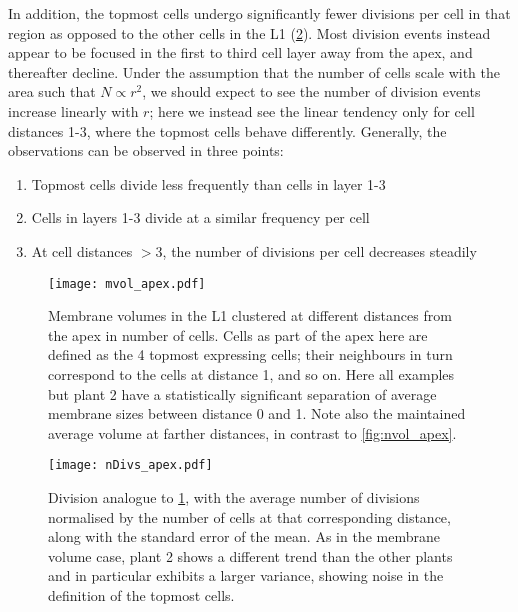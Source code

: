  In addition, the topmost cells undergo significantly fewer divisions per cell in
 that region as opposed to the other cells in the L1 (\cref{fig:nDivs_apex}).
 Most division events instead appear to be focused in the first to third cell
 layer away from the apex, and thereafter decline. Under the assumption that the
 number of cells scale with the area such that $N \propto r^2$, we should expect
 to see the number of division events increase linearly with $r$; here we
 instead see the linear tendency only for cell distances 1-3, where the topmost cells
 behave differently. Generally, the observations can be observed in three
 points:
 \begin{enumerate}
   \item Topmost cells divide less frequently than cells in layer 1-3
   \item Cells in layers 1-3 divide at a similar frequency per cell
   \item At cell distances $>3$, the number of divisions per cell decreases
     steadily
 \end{enumerate}


 \begin{figure}[H]
   \centering
   \texttt{[image: mvol\_apex.pdf]}
   \caption[Membrane volume clustering]{Membrane volumes in the L1 clustered at different distances from the apex in
     number of cells. Cells as part of the apex here are defined as the 4
     topmost expressing cells; their neighbours in turn correspond to the cells
     at distance 1, and so on. Here all examples but plant 2 have a
     statistically significant separation of average membrane sizes between
     distance
     0 and  1. Note also the maintained average volume at farther distances, in
     contrast to \cref{fig:nvol_apex}.}
  \label{fig:mvol_apex}
\end{figure}

\begin{figure}[H]
   \centering
   \texttt{[image: nDivs\_apex.pdf]}
   \caption[Division rate clustering]{Division analogue to \cref{fig:mvol_apex}, with the average number of
     divisions normalised by the number of cells at that corresponding
     distance, along with the standard error of the mean. As in the membrane
     volume case, plant 2 shows a different trend  
     than the other plants and in particular exhibits a larger variance,
     showing noise in the definition of the topmost cells. 
   }  
   \label{fig:nDivs_apex}
\end{figure}

